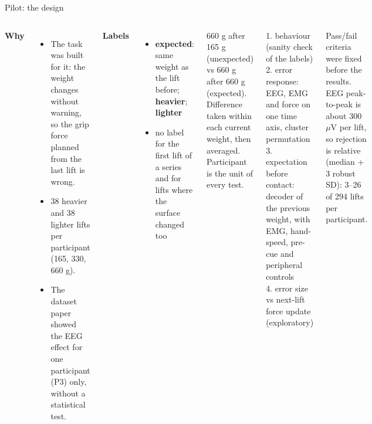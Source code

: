 \documentclass[aspectratio=169,10pt]{beamer}
\begin{document}
\begin{frame}{Pilot: the design}
  \begin{columns}[T]
    \textbf{Why}
    \begin{itemize}\scriptsize
      \item The task was built for it: the weight changes without warning, so the grip force planned from the last
            lift is wrong.
      \item 38 heavier and 38 lighter lifts per participant (165, 330, 660 g).
      \item The dataset paper showed the EEG effect for one participant (P3) only, without a statistical test.
    \end{itemize}
    \textbf{Labels}
    \begin{itemize}\scriptsize
      \item \textbf{expected}: same weight as the lift before; \textbf{heavier}; \textbf{lighter}
      \item no label for the first lift of a series and for lifts where the surface changed too
    \end{itemize}
    \begin{tcolorbox}[stagebox,title={Key control: same object, different expectation}]
      \scriptsize 660 g after 165 g (unexpected) vs 660 g after 660 g (expected). Difference taken within each current
      weight, then averaged. Participant is the unit of every test.
    \end{tcolorbox}
    \begin{tcolorbox}[notebox,title={Four analyses, no training}]
      \scriptsize
      1. behaviour (sanity check of the labels)\\
      2. error response: EEG, EMG and force on one time axis, cluster permutation\\
      3. expectation before contact: decoder of the previous weight, with EMG, hand-speed, pre-cue and peripheral controls\\
      4. error size vs next-lift force update (exploratory)
    \end{tcolorbox}
    {\scriptsize Pass/fail criteria were fixed before the results. EEG peak-to-peak is about 300 $\mu$V per lift, so
    rejection is relative (median + 3 robust SD): 3--26 of 294 lifts per participant.\par}
  \end{columns}
\end{frame}
\end{document}
